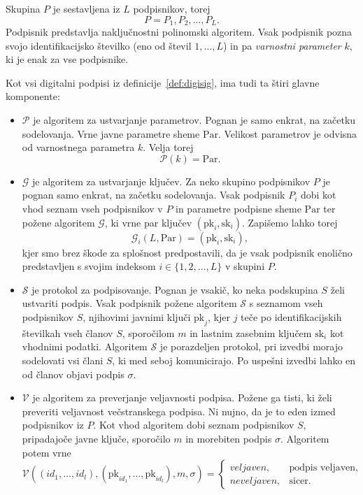 \begin{definicija}
\label{def:asm}
    Skupina $P$ je sestavljena iz $L$ podpisnikov, torej
    $$
    P = P_1, P_2, \dots, P_L.
    $$
    Podpisnik predstavlja naključnostni polinomski algoritem. Vsak podpisnik pozna svojo 
    identifikacijsko številko (eno od števil $1, \dots, L$) in pa \textit{varnostni parameter} $k$,
    ki je enak za vse podpisnike.

    Kot vsi digitalni podpisi iz definicije~\ref{def:digisig}, ima tudi ta štiri glavne komponente:
    \begin{itemize}
        \item $\mathcal{P}$ je algoritem za ustvarjanje parametrov. Pognan je samo enkrat, na začetku
            sodelovanja. Vrne javne parametre sheme $\text{Par}$. Velikost parametrov je odvisna od
            varnostnega parametra $k$. Velja torej
            $$
            \mathcal{P}(k) = \text{Par}.
            $$
        \item $\mathcal{G}$ je algoritem za ustvarjanje ključev. Za neko skupino podpisnikov $P$ je pognan samo
            enkrat, na začetku sodelovanja. Vsak podpisnik $P_i$ dobi kot vhod seznam vseh podpisnikov v $P$
            in parametre podpisne sheme $\text{Par}$ ter požene algoritem $\mathcal{G}$, ki vrne par ključev
            $(\text{pk}_i, \text{sk}_i)$. Zapišemo lahko torej
            $$
            \mathcal{G}_i(L, \text{Par}) = (\text{pk}_i, \text{sk}_i),
            $$
            kjer smo brez škode za splošnost predpostavili, da je vsak podpisnik enolično predstavljen
            s svojim indeksom $i \in \{1, 2, \dots, L\}$ v skupini $P$.
        \item $\mathcal{S}$ je protokol za podpisovanje. Pognan je vsakič, ko neka podskupina $S$ želi
            ustvariti podpis. Vsak podpisnik požene algoritem $\mathcal{S}$ s seznamom vseh podpisnikov
            $S$, njihovimi javnimi ključi $\text{pk}_j$, kjer $j$ teče po identifikacijskih številkah
            vseh članov $S$, sporočilom $m$ in lastnim zasebnim ključem $\text{sk}_i$ kot vhodnimi
            podatki. Algoritem $\mathcal{S}$ je porazdeljen protokol, pri izvedbi morajo sodelovati
            vsi člani $S$, ki med seboj komunicirajo. Po uspešni izvedbi lahko en od članov objavi
            podpis $\sigma$.
        \item $\mathcal{V}$ je algoritem za preverjanje veljavnosti podpisa. Požene ga tisti, ki želi 
            preveriti veljavnost večstranskega podpisa. Ni nujno, da je to eden izmed podpisnikov iz $P$. 
            Kot vhod algoritem dobi seznam podpisnikov $S$, pripadajoče javne ključe, sporočilo $m$ in 
            morebiten podpis $\sigma$. Algoritem potem vrne
            $$ 
            \mathcal{V}((id_1, \dots, id_l), (\text{pk}_{id_1}, \dots, \text{pk}_{id_l}), m, \sigma) = 
            \begin{cases}
                veljaven, & \text{podpis veljaven}, \\
                neveljaven, & \text{sicer}.
            \end{cases}
            $$
    \end{itemize}
\end{definicija}

